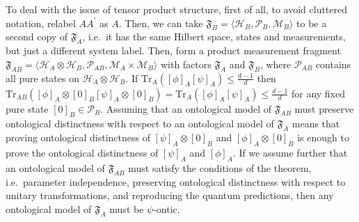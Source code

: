 \documentclass[DIV=calc,fontsize=12pt]{scrartcl} %
\theoremstyle{definition}
\theoremstyle{plain}
\newcommand{\Proj}[1]{\ensuremath{\left [ #1 \right ]}}
\newcommand{\Hilb}[1][]{\ensuremath{\mathcal{H}_{#1}}}
\newcommand{\Tr}[2][]{\ensuremath{\text{Tr}_{#1} \left ( #2 \right )}}
\begin{document}
To deal with the issue of tensor product structure, first of all, to
avoid cluttered notation, relabel $AA^{\prime}$ as $A$.  Then, we can
take $\mathfrak{F}_B = \langle \Hilb[B], \mathcal{P}_B, \mathcal{M}_B
\rangle$ to be a second copy of $\mathfrak{F}_A$, i.e.\ it has the
same Hilbert space, states and measurements, but just a different
system label.  Then, form a product measurement fragment
$\mathfrak{F}_{AB} = \langle \Hilb[A] \otimes \Hilb[B],
\mathcal{P}_{AB}, \mathcal{M}_A \times \mathcal{M}_B \rangle$ with
factors $\mathfrak{F}_A$ and $\mathfrak{F}_B$, where
$\mathcal{P}_{AB}$ contains all pure states on $\Hilb[A] \otimes
\Hilb[B]$.  If $\Tr[A]{\Proj{\phi}_A\Proj{\psi}_A} \leq \frac{d-1}{d}$
then $\Tr[AB]{\Proj{\phi}_A \otimes \Proj{0}_B\Proj{\psi}_A \otimes
\Proj{0}_B} = \Tr[A]{\Proj{\phi}_A\Proj{\psi}_A} \leq \frac{d-1}{d}$
for any fixed pure state $\Proj{0}_B \in \mathcal{P}_B$.  Assuming
that an ontological model of $\mathfrak{F}_{AB}$ must preserve
ontological distinctness with respect to an ontological model of
$\mathfrak{F}_A$ means that proving ontological distinctness of
$\Proj{\psi}_A \otimes \Proj{0}_B$ and $\Proj{\phi}_A \otimes
\Proj{0}_B$ is enough to prove the ontological distinctness of
$\Proj{\psi}_A$ and $\Proj{\phi}_A$.  If we assume further that an
ontological model of $\mathfrak{F}_{AB}$ must satisfy the conditions
of the theorem, i.e.\ parameter independence, preserving ontological
distinctness with respect to unitary transformations, and reproducing
the quantum predictions, then any ontological model of
$\mathfrak{F}_A$ must be $\psi$-ontic.
\end{document}
